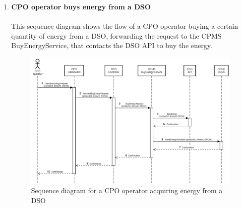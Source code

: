 \documentclass[12pt]{report}
\begin{document}
\begin{enumerate}[1.]
    \newpage


    \item\textbf{CPO operator buys energy from a DSO}\\
    \\
    This sequence diagram shows the flow of a CPO operator buying a certain quantity of energy from a DSO, forwarding the request  to the CPMS BuyEnergyService, that contacts the DSO API to buy the energy. \\


    \begin{figure}[ht]
    \centering
    \includegraphics[width=\textwidth]{assets/sequencediagramBuyenergy.png}
    \caption{Sequence diagram for a CPO operator acquiring energy from a DSO}
    \label{fig:my_label6675}
    \end{figure}

    \newpage
    
\end{enumerate}
\end{document}
